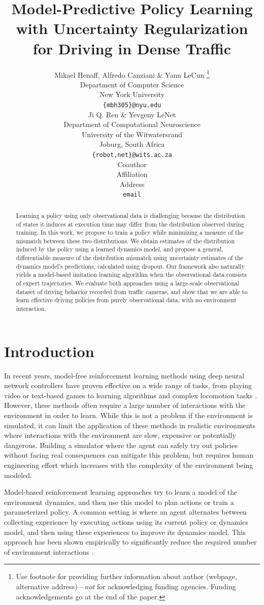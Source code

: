 \documentclass{article} %
\title{Model-Predictive Policy Learning with Uncertainty Regularization for Driving in Dense Traffic}
\author{Mikael Henaff, Alfredo Canziani \& Yann LeCun \thanks{ Use footnote for providing further information
about author (webpage, alternative address)---\emph{not} for acknowledging
funding agencies.  Funding acknowledgements go at the end of the paper.} \\
Department of Computer Science\\
New York University\\
\texttt{\{mbh305\}@nyu.edu} \\
\And
Ji Q. Ren \& Yevgeny LeNet \\
Department of Computational Neuroscience \\
University of the Witwatersrand \\
Joburg, South Africa \\
\texttt{\{robot,net\}@wits.ac.za} \\
\AND
Coauthor \\
Affiliation \\
Address \\
\texttt{email}
}
\begin{document}
\maketitle

\begin{abstract}
  Learning a policy using only observational data is challenging because the distribution of states it induces at execution time may differ from the distribution observed during training.
  In this work, we propose to train a policy while minimizing a measure of the mismatch between these two distributions.
  We obtain estimates of the distribution induced by the policy using a learned dynamics model, and propose a general, differentiable measure of the distribution mismatch using uncertainty estimates of the dynamics model's predictions, calculated using dropout. Our framework also naturally yields a model-based imitation learning algorithm when the observational data consists of expert trajectories.
  We evaluate both approaches using a large-scale observational dataset of driving behavior recorded from traffic cameras, and show that we are able to learn effective driving policies from purely observational data, with no environment interaction. 
\end{abstract}


\section{Introduction}

In recent years, model-free reinforcement learning methods using deep neural network controllers have proven effective on a wide range of tasks, from playing video or text-based games \citep{mnih15, A3C, NarasimhanKB15} to learning algorithms \citep{Zaremba15} and complex locomotion tasks \citep{Lillicrap2015, ZhangLMUC15}.
However, these methods often require a large number of interactions with the environment in order to learn.
While this is not a problem if the environment is simulated, it can limit the application of these methods in realistic environments where interactions with the environment are slow, expensive or potentially dangerous.
Building a simulator where the agent can safely try out policies without facing real consequences can mitigate this problem, but requires human engineering effort which increases with the complexity of the environment being modeled.


Model-based reinforcement learning approaches try to learn a model of the environment dynamics, and then use this model to plan actions or train a parameterized policy.
A common setting is where an agent alternates between collecting experience by executing actions using its current policy or dynamics model, and then using these experiences to improve its dynamics model.
This approach has been shown empirically to significantly reduce the required number of environment interactions \citep{Atkeson1997, PILCO, Nagabandi2017, Chua2018}.
\end{document}
